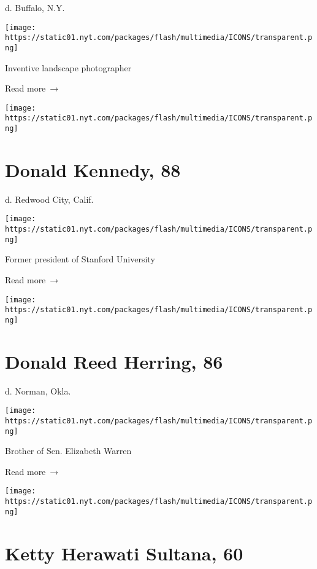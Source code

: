 d. Buffalo, N.Y.

\texttt{[image: https://static01.nyt.com/packages/flash/multimedia/ICONS/transparent.png]}

Inventive landscape photographer

 Read more~→

\href{https://www.nytimes.com/2020/04/23/us/donald-kennedy-who-led-stanford-in-1980s-dies-at-88.html}{}

\texttt{[image: https://static01.nyt.com/packages/flash/multimedia/ICONS/transparent.png]}

\hypertarget{donald-kennedy-88}{%
\section{Donald Kennedy, 88}\label{donald-kennedy-88}}

d. Redwood City, Calif.

\texttt{[image: https://static01.nyt.com/packages/flash/multimedia/ICONS/transparent.png]}

Former president of Stanford University

 Read more~→

\href{https://www.nytimes.com/2020/04/23/us/politics/donald-herring-dead-coronavirus.html}{}

\texttt{[image: https://static01.nyt.com/packages/flash/multimedia/ICONS/transparent.png]}

\hypertarget{donald-reed-herring-86}{%
\section{Donald Reed Herring, 86}\label{donald-reed-herring-86}}

d. Norman, Okla.

\texttt{[image: https://static01.nyt.com/packages/flash/multimedia/ICONS/transparent.png]}

Brother of Sen. Elizabeth Warren

 Read more~→

\href{https://www.nytimes.com/2020/04/23/obituaries/ketty-herawati-sultana-coronavirus-dead.html}{}

\texttt{[image: https://static01.nyt.com/packages/flash/multimedia/ICONS/transparent.png]}

\hypertarget{ketty-herawati-sultana-60}{%
\section{Ketty Herawati Sultana, 60}\label{ketty-herawati-sultana-60}}

